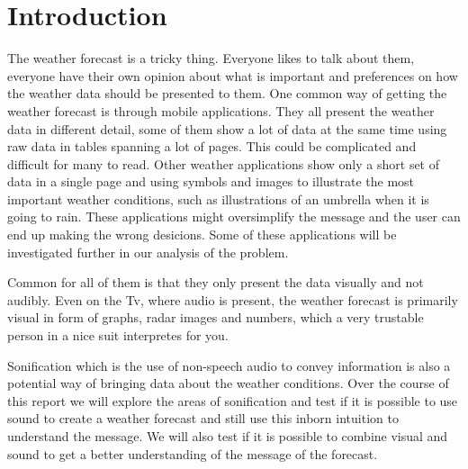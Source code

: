 
\section{Introduction} %
\label{sec:introduction}

The weather forecast is a tricky thing. 
Everyone likes to talk about them, everyone have their own opinion about what is important and preferences on how the weather data should be presented to them. 
One common way of getting the weather forecast is through mobile applications. 
They all present the weather data in different detail, some of them show a lot of data at the same time using raw data in tables spanning a lot of pages. 
This could be complicated and difficult for many to read. 
Other weather applications show only a short set of data in a single page and using symbols and images to illustrate the most important weather conditions, such as illustrations of an umbrella when it is going to rain.
These applications might oversimplify the message and the user can end up making the wrong desicions. 
Some of these applications will be investigated further in our analysis of the problem.

Common for all of them is that they only present the data visually and not audibly. 
Even on the Tv, where audio is present, the weather forecast is primarily visual in form of graphs, radar images and numbers, which a very trustable person in a nice suit interpretes for you.

Sonification which is the use of non-speech audio to convey information is also a potential way of bringing data about the weather conditions. 
Over the course of this report we will explore the areas of sonification and test if it is possible to use sound to create a weather forecast and still use this inborn intuition to understand the message.
We will also test if it is possible to combine visual and sound to get a better understanding of the message of the forecast.



